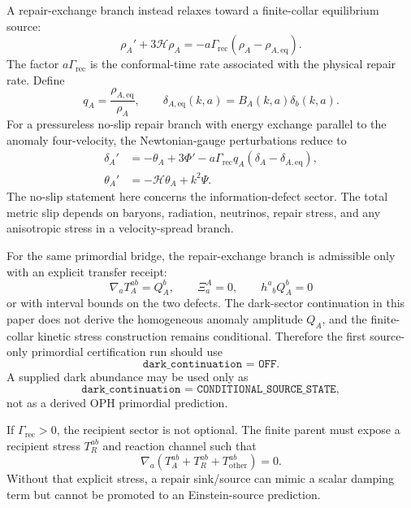 \documentclass[11pt]{article}
\begin{document}
A repair-exchange branch instead relaxes toward a finite-collar equilibrium
source:
\begin{equation}
  \rho_A' + 3\mathcal H\rho_A
  = -a\Gamma_{\mathrm{rec}}(\rho_A-\rho_{A,\mathrm{eq}}).
  \label{eq:repairbackground}
\end{equation}
The factor \(a\Gamma_{\mathrm{rec}}\) is the conformal-time rate associated
with the physical repair rate.  Define
\begin{equation}
  q_A=\frac{\rho_{A,\mathrm{eq}}}{\rho_A},
  \qquad
  \delta_{A,\mathrm{eq}}(k,a)=B_A(k,a)\delta_b(k,a).
\end{equation}
For a pressureless no-slip repair branch with energy exchange parallel to
the anomaly four-velocity, the Newtonian-gauge perturbations reduce to
\begin{align}
  \delta_A'
    &=-\theta_A+3\Phi'
      -a\Gamma_{\mathrm{rec}}q_A
       (\delta_A-\delta_{A,\mathrm{eq}}),
       \label{eq:deltaA}\\
  \theta_A'
    &=-\mathcal H\theta_A+k^2\Psi.
       \label{eq:thetaA}
\end{align}
The no-slip statement here concerns the information-defect sector.  The total
metric slip depends on baryons, radiation, neutrinos, repair stress, and any
anisotropic stress in a velocity-spread branch.

For the same primordial bridge, the repair-exchange branch is admissible only
with an explicit transfer receipt:
\begin{equation}
  \nabla_aT_A^{ab}=Q_A^b,\qquad
  \Xi_a^A=0,\qquad
  h^a{}_bQ_A^b=0
  \label{eq:repair-anomaly-primordial-contract}
\end{equation}
or with interval bounds on the two defects.  The dark-sector continuation in this
paper does not derive the homogeneous anomaly amplitude \(Q_A\), and the
finite-collar kinetic stress construction remains conditional.  Therefore the first
source-only primordial certification run should use
\[
  \texttt{dark\_continuation = OFF}.
\]
A supplied dark abundance may be used only as
\[
  \texttt{dark\_continuation = CONDITIONAL\_SOURCE\_STATE},
\]
not as a derived OPH primordial prediction.

If \(\Gamma_{\mathrm{rec}}>0\), the recipient sector is not optional.  The
finite parent must expose a recipient stress \(T_R^{ab}\) and reaction channel
such that
\[
  \nabla_a(T_A^{ab}+T_R^{ab}+T_{\mathrm{other}}^{ab})=0 .
\]
Without that explicit stress, a repair sink/source can mimic a scalar damping
term but cannot be promoted to an Einstein-source prediction.
\end{document}
